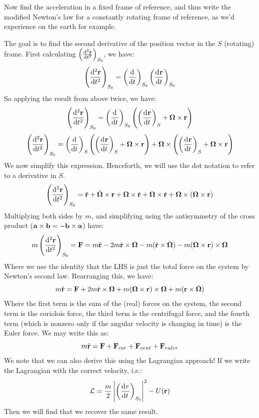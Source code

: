 \begin{p}
Now find the acceleration in a fixed frame of reference, and thus write the modified Newton’s law for a constantly rotating frame of reference, as we’d experience on the earth for example. 
\end{p}
\begin{s}
The goal is to find the second derivative of the position vector in the $S$ (rotating) frame. First calculating $\left(\od[2]{\v{r}}{t}\right)_{S_0}$, we have:
\[\left(\dod[2]{\v{r}}{t}\right)_{S_0} = \left(\dod{}{t}\right)_{S_0}\left(\dod{\v{r}}{t}\right)_{S_0}\]
So applying the result from above twice, we have:
\[\left(\dod[2]{\v{r}}{t}\right)_{S_0} = \left(\dod{}{t}\right)_{S_0}\left(\left(\dod{\v{r}}{t}\right)_S + \bm{\Omega} \times \v{r}\right)\]
\[\left(\dod[2]{\v{r}}{t}\right)_{S_0} = \left(\dod{}{t}\right)_{S}\left(\left(\dod{\v{r}}{t}\right)_S + \bm{\Omega} \times \v{r}\right) + \bm{\Omega}\times \left(\left(\dod{\v{r}}{t}\right)_S + \bm{\Omega} \times \v{r}\right)\]
We now simplify this expression. Henceforth, we will use the dot notation to refer to a derivative in $S$. \[\left(\dod[2]{\v{r}}{t}\right)_{S_0} =
\ddot{\v{r}} + \dot{\bm{\Omega}}\times \v{r} + \bm{\Omega} \times \dot{\v{r}} + \bm{\Omega} \times \dot{\v{r}} + \bm{\Omega} \times (\bm{\Omega} \times \v{r})\]
Multiplying both sides by $m$, and simplifying using the antisymmetry of the cross product ($\mathbf{a} \times \mathbf{b} = -\mathbf{b} \times \mathbf{a}$) have:
\[m\left(\dod[2]{\v{r}}{t}\right)_{S_0} = \v{F} = 
m\ddot{\v{r}} - 2m\dot{\v{r}}\times\bm{\Omega} - m(\dot{\v{r}}\times \dot{\bm{\Omega}}) - m(\bm{\Omega} \times \v{r}) \times \bm{\Omega}\] 
Where we use the identity that the LHS is just the total force on the system by Newton's second law. Rearranging this, we have:
\[m\ddot{\mathbf{r}} = \mathbf{F} + 2m\dot{\mathbf{r}}\times \bm{\Omega} + m(\bm{\Omega} \times \mathbf{r})\times \bm{\Omega} + m(\mathbf{r} \times \dot{\bm{\Omega}})\]
Where the first term is the sum of the (real) forces on the system, the second term is the coriolois force, the third term is the centrifugal force, and the fourth term (which is nonzero only if the angular velocity is changing in time) is the Euler force. We may write this as:
\[m\ddot{\mathbf{r}} = \mathbf{F} + \mathbf{F}_{cor} + \mathbf{F}_{cent} + \mathbf{F}_{euler}\]
We note that we can also derive this using the Lagrangian approach! If we write the Lagrangian with the correct velocity, i.e.:
\[\LL = \frac{m}{2}\left|\left(\dod{r}{t}\right)_{S_0}\right|^2 - U(\v{r})\]
Then we will find that we recover the same result.

\end{s}